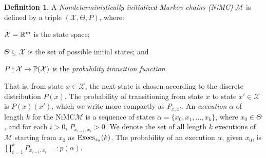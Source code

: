 \documentclass[11pt]{article}
\theoremstyle{definition}
\newtheorem{definition}{Definition}
\newcommand{\num}[1]{\relax\ifmmode \mathbb #1\else $\mathbb #1$\fi}
\newcommand{\reals}{{\num R}}                    %
\newcommand{\M}{\mathcal{M}}
\newcommand{\X}{\mathcal{X}}
\newcommand{\Prob}{{\num P}}
\newcommand{\Trans}[3]{{#1}_{{#2,#3}}}
\newcommand{\Unsafe}{\mathcal{U}}
\newcommand{\modelname}{NiMC\xspace}
\newcommand{\execs}[1]{{{\rm{Execs}}_{#1}}}
\begin{document}
\begin{definition}
\label{def:mpis}
A {\em Nondeterministically initialized Markov chains (\modelname)\/} $\M$ is defined by a triple $(\mathcal{X}, \Theta, P)$, where:
\begin{inparaenum}[(i)]
\item $\X = \reals^m$ is the state space;
\item $\Theta \subseteq \X$ is the set of possible initial states; and
\item $P:\X \rightarrow \Prob(\X)$ is the {\em probability transition function}.
\end{inparaenum}
\end{definition}
That is, from state $x \in \X$, the next state is chosen according to the discrete distribution $P(x)$. The probability of transitioning from state $x$ to state $x' \in \X$ is $P(x)(x')$, which we write more compactly as $\Trans{P}{x}{x'}$.
%
An {\em execution} $\alpha$ of length $k$ for the \modelname $\M$ is a sequence of states $\alpha = \{x_0, x_1, \ldots , x_k\}$, where $x_0 \in \Theta$, and for each $i>0$, $\Trans{P}{x_{i-1}}{x_{i}} > 0.$
We denote the set of all length $k$ executions of $\M$ starting from $x_0$ as $\execs{\mathit{x_0}}(k)$.
%
The probability of  an execution $\alpha$, given $x_0$,  is
$ \prod_{i=1}^k \Trans{P}{x_{i-1}}{x_i}=:p(\alpha) $.
\end{document}
